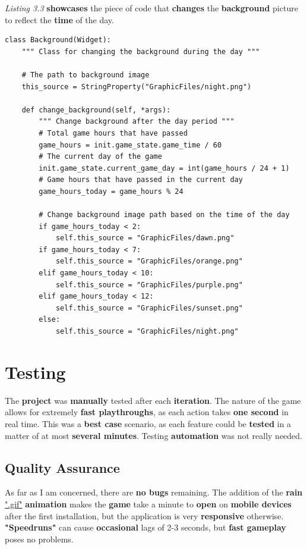 			\par \textit{Listing 3.3} \textbf{showcases} the piece of code that \textbf{changes} the \textbf{background} picture to reflect the \textbf{time} of the day.
			
\begin{lstlisting}[caption={\textbf{Kivy} Implementation of the \textbf{Background Change}},captionpos=b]
class Background(Widget):
    """ Class for changing the background during the day """

    # The path to background image
    this_source = StringProperty("GraphicFiles/night.png")

    def change_background(self, *args):
        """ Change background after the day period """
        # Total game hours that have passed
        game_hours = init.game_state.game_time / 60
        # The current day of the game
        init.game_state.current_game_day = int(game_hours / 24 + 1)
        # Game hours that have passed in the current day
        game_hours_today = game_hours % 24

        # Change background image path based on the time of the day
        if game_hours_today < 2:
            self.this_source = "GraphicFiles/dawn.png"
        if game_hours_today < 7:
            self.this_source = "GraphicFiles/orange.png"
        elif game_hours_today < 10:
            self.this_source = "GraphicFiles/purple.png"
        elif game_hours_today < 12:
            self.this_source = "GraphicFiles/sunset.png"
        else:
            self.this_source = "GraphicFiles/night.png"
			\end{lstlisting}

	\section{Testing} 
		\par The \textbf{project} was \textbf{manually} tested after each \textbf{iteration}. The nature of the game allows for extremely \textbf{fast playthroughs}, as each action takes \textbf{one second} in real time. This was a \textbf{best case} scenario, as each feature could be \textbf{tested} in a matter of at most \textbf{several minutes}. Testing \textbf{automation} was not really needed.
		
		\subsection{Quality Assurance}
			\par As far as I am concerned, there are \textbf{no bugs} remaining. The addition of the \textbf{rain} \underline{".gif"} \textbf{animation} makes the \textbf{game} take a minute to \textbf{open} on \textbf{mobile devices} after the first installation, but the application is very \textbf{responsive} otherwise. \textbf{"Speedruns"} can cause \textbf{occasional} lags of 2-3 seconds, but \textbf{fast gameplay} poses no problems.

